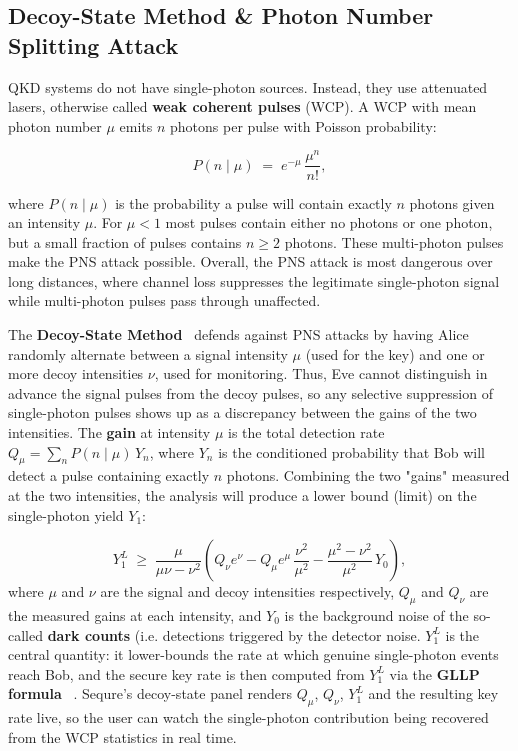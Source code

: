 \documentclass[12pt, a4paper]{article}
\begin{document}
\subsection{Decoy-State Method \& Photon Number Splitting Attack}
\label{sec:decoy-state}

QKD systems do not have single-photon sources. Instead, they use
attenuated lasers, otherwise called \textbf{weak coherent pulses} (WCP). A WCP
with mean photon number $\mu$ emits $n$ photons per pulse with Poisson
probability:

\begin{equation*}
  P(n \mid \mu) \;=\; e^{-\mu}\,\frac{\mu^n}{n!},
  \label{eq:poisson}
\end{equation*}

where $P(n \mid \mu)$ is the probability a pulse will contain exactly $n$ photons given an intensity $\mu$. For $\mu<1$ most pulses contain either no photons or one photon, but a small fraction of pulses contains $n\geq2$ photons. These multi-photon pulses make the PNS attack possible. Overall, the PNS attack is most dangerous over long distances, where channel loss suppresses the legitimate single-photon signal while multi-photon pulses pass through unaffected. 

The \textbf{Decoy-State Method}~\cite{lo2005decoy,wang2005decoy} defends against PNS attacks by having Alice randomly alternate between a signal intensity $\mu$ (used for the key) and one or more decoy intensities $\nu$, used for monitoring. Thus, Eve cannot distinguish in advance the signal pulses from the decoy pulses, so any selective suppression of single-photon pulses shows up as a discrepancy between the gains of the two intensities. The \textbf{gain} at intensity $\mu$ is the total detection rate $Q_\mu = \sum_n P(n \mid \mu)\,Y_n$, where $Y_n$ is the conditioned probability that Bob will detect a pulse containing exactly $n$ photons. Combining the two "gains" measured at the two intensities, the analysis will produce a lower bound (limit) on the single-photon yield $Y_1$:

\begin{equation*}
  Y_1^{L} \;\geq\;
    \frac{\mu}{\mu\nu - \nu^2}\!\left(
      Q_\nu e^{\nu} - Q_\mu e^{\mu}\,\frac{\nu^2}{\mu^2}
      - \frac{\mu^2 - \nu^2}{\mu^2}\,Y_0
    \right),
  \label{eq:y1-bound}
\end{equation*}
where $\mu$ and $\nu$ are the signal and decoy intensities respectively, $Q_\mu$ and $Q_\nu$ are the measured gains at each intensity, and $Y_0$ is the background noise of the so-called \textbf{dark counts} (i.e. detections triggered by the detector noise. $Y_1^L$ is the central quantity: it lower-bounds the rate at which genuine single-photon events reach Bob, and the secure key rate is then computed from $Y_1^L$ via the \textbf{GLLP formula} ~\cite{gllp2004}. Sequre's decoy-state panel renders $Q_\mu$, $Q_\nu$, $Y_1^L$ and the resulting key rate live, so the user can watch the single-photon contribution being recovered from the WCP statistics in real time.
\end{document}
